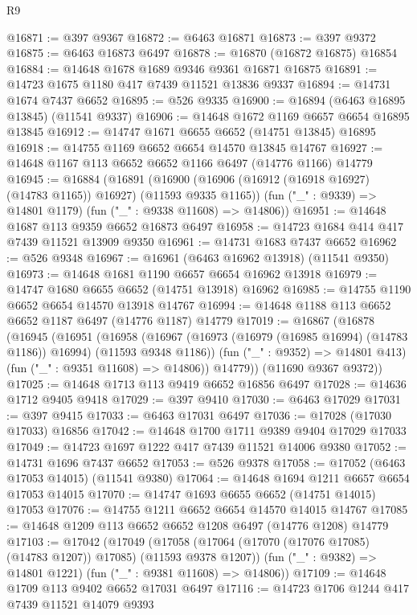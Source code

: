 \begin{lexlean}{R9}
\begin{coremodule}
{{{{{{{{{{{{{{{{{{{{{{{{{{{{{{{{{{{{{{{{{{{{{{{{{{{{{{{{{{{{{{{{{{{{{{{{{{{{{{{{{{{{@16871 := @397 @9367
@16872 := @6463 @16871
@16873 := @397 @9372
@16875 := @6463 @16873 @6497
@16878 := @16870 (@16872 @16875) @16854
@16884 := @14648 @1678 @1689 @9346 @9361 @16871 @16875
@16891 := @14723 @1675 @1180 @417 @7439 @11521 @13836 @9337
@16894 := @14731 @1674 @7437 @6652
@16895 := @526 @9335
@16900 := @16894 (@6463 @16895 @13845) (@11541 @9337)
@16906 := @14648 @1672 @1169 @6657 @6654 @16895 @13845
@16912 := @14747 @1671 @6655 @6652 (@14751 @13845) @16895
@16918 := @14755 @1169 @6652 @6654 @14570 @13845 @14767
@16927 := @14648 @1167 @113 @6652 @6652 @1166 @6497 (@14776 @1166) @14779
@16945 := @16884
    (@16891
      (@16900 (@16906 (@16912 (@16918 @16927) (@14783 @1165)) @16927) (@11593 @9335 @1165))
      (fun ("_" : @9339) => @14801 @1179)
      (fun ("_" : @9338 @11608) => @14806))
@16951 := @14648 @1687 @113 @9359 @6652 @16873 @6497
@16958 := @14723 @1684 @414 @417 @7439 @11521 @13909 @9350
@16961 := @14731 @1683 @7437 @6652
@16962 := @526 @9348
@16967 := @16961 (@6463 @16962 @13918) (@11541 @9350)
@16973 := @14648 @1681 @1190 @6657 @6654 @16962 @13918
@16979 := @14747 @1680 @6655 @6652 (@14751 @13918) @16962
@16985 := @14755 @1190 @6652 @6654 @14570 @13918 @14767
@16994 := @14648 @1188 @113 @6652 @6652 @1187 @6497 (@14776 @1187) @14779
@17019 := @16867
    (@16878
      (@16945
        (@16951
          (@16958
            (@16967 (@16973 (@16979 (@16985 @16994) (@14783 @1186)) @16994) (@11593 @9348 @1186))
            (fun ("_" : @9352) => @14801 @413)
            (fun ("_" : @9351 @11608) => @14806))
          @14779))
      (@11690 @9367 @9372))
@17025 := @14648 @1713 @113 @9419 @6652 @16856 @6497
@17028 := @14636 @1712 @9405 @9418
@17029 := @397 @9410
@17030 := @6463 @17029
@17031 := @397 @9415
@17033 := @6463 @17031 @6497
@17036 := @17028 (@17030 @17033) @16856
@17042 := @14648 @1700 @1711 @9389 @9404 @17029 @17033
@17049 := @14723 @1697 @1222 @417 @7439 @11521 @14006 @9380
@17052 := @14731 @1696 @7437 @6652
@17053 := @526 @9378
@17058 := @17052 (@6463 @17053 @14015) (@11541 @9380)
@17064 := @14648 @1694 @1211 @6657 @6654 @17053 @14015
@17070 := @14747 @1693 @6655 @6652 (@14751 @14015) @17053
@17076 := @14755 @1211 @6652 @6654 @14570 @14015 @14767
@17085 := @14648 @1209 @113 @6652 @6652 @1208 @6497 (@14776 @1208) @14779
@17103 := @17042
    (@17049
      (@17058 (@17064 (@17070 (@17076 @17085) (@14783 @1207)) @17085) (@11593 @9378 @1207))
      (fun ("_" : @9382) => @14801 @1221)
      (fun ("_" : @9381 @11608) => @14806))
@17109 := @14648 @1709 @113 @9402 @6652 @17031 @6497
@17116 := @14723 @1706 @1244 @417 @7439 @11521 @14079 @9393
}}}}}}}}}}}}}}}}}}}}}}}}}}}}}}}}}}}}}}}}}}}}}}}}}}}}}}}}}}}}}}}}}}}}}}}}}}}}}}}}}}}}
\end{coremodule}
\end{lexlean}
